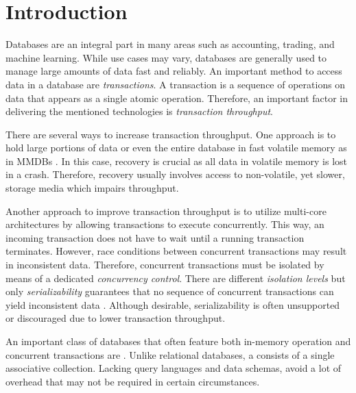 \chapter{Introduction}
\label{ch:intro}


Databases are an integral part in many areas such as accounting, trading, and
machine learning. While use cases may vary, databases are generally used to
manage large amounts of data fast and reliably. An important method to access
data in a database are \emph{transactions}. A transaction is a sequence of
operations on data that appears as a single atomic operation. Therefore, an
important factor in delivering the mentioned technologies is \emph{transaction
throughput}.

There are several ways to increase transaction throughput. One approach is to
hold large portions of data or even the entire database in fast volatile memory
as in \acp{MMDB} \cite{grund2010hyrise, lee2013sap, diaconu2013hekaton}. In
this case, recovery is crucial as all data in volatile memory is lost in a
crash. Therefore, recovery usually involves access to non-volatile, yet slower,
storage media which impairs throughput.

Another approach to improve transaction throughput is to utilize multi-core
architectures by allowing transactions to execute concurrently. This way, an
incoming transaction does not have to wait until a running transaction
terminates. However, race conditions between concurrent transactions may result
in inconsistent data. Therefore, concurrent transactions must be isolated by
means of a dedicated \emph{concurrency control}. There are different
\emph{isolation levels} but only \emph{serializability} guarantees that no
sequence of concurrent transactions can yield inconsistent data
\cite{berenson1995critique, larson2011high, neumann2015fast}. Although
desirable, serializability is often unsupported or discouraged due to lower
transaction throughput.

An important class of databases that often feature both in-memory operation and
concurrent transactions are \emph{\kvsp} \cite{decandia2007dynamo,
chang2008bigtable, lakshman2010cassandra}. Unlike relational databases, a \kvs
consists of a single associative collection. Lacking query languages and data
schemas, \kvsp avoid a lot of overhead that may not be required in certain
circumstances.


